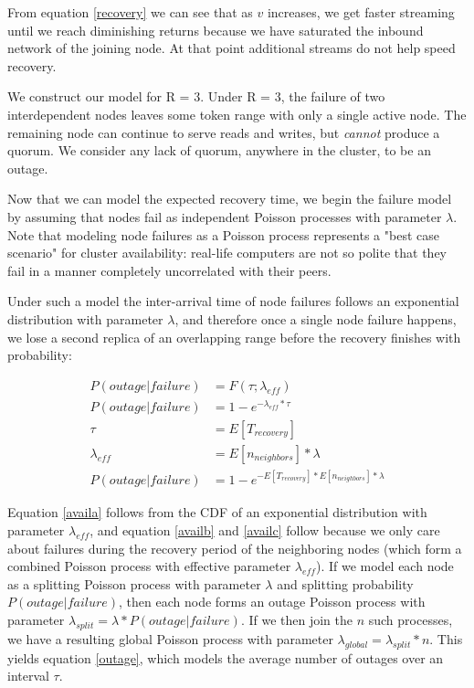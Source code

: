 \documentclass{article}
\begin{document}
From equation \ref{recovery} we can see that as $v$ increases, we get faster
streaming until we reach diminishing returns because we have saturated the
inbound network of the joining node. At that point additional streams do not
help speed recovery.

We construct our model for R = 3. Under R = 3, the failure of two
interdependent nodes leaves some token range with only a single active node.
The remaining node can continue to serve reads and writes, but \emph{cannot}
produce a quorum. We consider any lack of quorum, anywhere in the cluster, to
be an outage.

Now that we can model the expected recovery time, we begin the failure model by
assuming that nodes fail as independent Poisson processes with parameter
$\lambda$. Note that modeling node failures as a Poisson process represents a
"best case scenario" for cluster availability: real-life computers are not so
polite that they fail in a manner completely uncorrelated with their peers.

Under such a model the inter-arrival time of node failures follows an
exponential distribution with parameter $\lambda$, and therefore once a single
node failure happens, we lose a second replica of an overlapping range before
the recovery finishes with probability:

\begin{subequations} \label{avail}
\begin{align}
        P(outage|failure) & = F(\tau; \lambda_{eff}) \\ \label{availa}
        P(outage|failure) & = 1 - e^{-\lambda_{eff} * \tau} \\ \label{availb}
        \tau & = E[T_{recovery}] \\ \label{availc}
        \lambda_{eff} & = E[n_{neighbors}] * \lambda \\ \label{availd}
        P(outage|failure) & = 1 - e^{- E[T_{recovery}] * E[n_{neighbors}] * \lambda}
\end{align}
\end{subequations}

Equation \ref{availa} follows from the CDF of an exponential distribution with
parameter $\lambda_{eff}$, and equation \ref{availb} and \ref{availc} follow
because we only care about failures during the recovery period of the
neighboring nodes (which form a combined Poisson process with effective
parameter $\lambda_{eff}$). If we model each node as a splitting Poisson
process with parameter $\lambda$ and splitting probability $P(outage|failure)$,
then each node forms an outage Poisson process with parameter $\lambda_{split}
= \lambda * P(outage|failure)$. If we then join the $n$ such processes, we have
a resulting global Poisson process with parameter $\lambda_{global} =
\lambda_{split} * n$. This yields equation \ref{outage}, which models the
average number of outages over an interval $\tau$.
\end{document}
